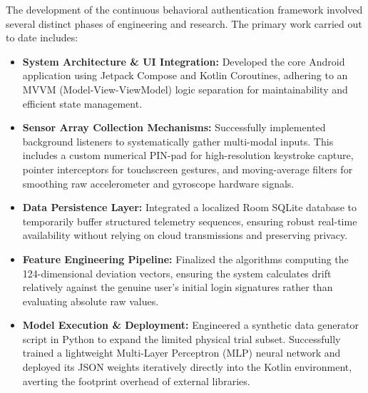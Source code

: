 \documentclass[12pt,a4paper]{report}
\begin{document}
The development of the continuous behavioral authentication framework involved several distinct phases of engineering and research. The primary work carried out to date includes:

\begin{itemize}
    \item \textbf{System Architecture \& UI Integration:} Developed the core Android application using Jetpack Compose and Kotlin Coroutines, adhering to an MVVM (Model-View-ViewModel) logic separation for maintainability and efficient state management.
    \item \textbf{Sensor Array Collection Mechanisms:} Successfully implemented background listeners to systematically gather multi-modal inputs. This includes a custom numerical PIN-pad for high-resolution keystroke capture, pointer interceptors for touchscreen gestures, and moving-average filters for smoothing raw accelerometer and gyroscope hardware signals.
    \item \textbf{Data Persistence Layer:} Integrated a localized Room SQLite database to temporarily buffer structured telemetry sequences, ensuring robust real-time availability without relying on cloud transmissions and preserving privacy.
    \item \textbf{Feature Engineering Pipeline:} Finalized the algorithms computing the 124-dimensional deviation vectors, ensuring the system calculates drift relatively against the genuine user's initial login signatures rather than evaluating absolute raw values.
    \item \textbf{Model Execution \& Deployment:} Engineered a synthetic data generator script in Python to expand the limited physical trial subset. Successfully trained a lightweight Multi-Layer Perceptron (MLP) neural network and deployed its JSON weights iteratively directly into the Kotlin environment, averting the footprint overhead of external libraries.
\end{itemize}
\end{document}
